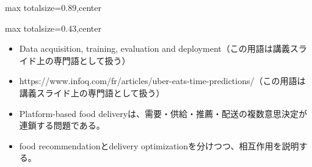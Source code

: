 \begin{minipage}[t]{0.58\textwidth}
\begin{adjustbox}{max totalsize={\textwidth}{0.89\textheight},center}
\begin{minipage}{\textwidth}
\end{minipage}
\end{adjustbox}
\end{minipage}


\clearpage
{}
\begin{minipage}[t]{0.405\textwidth}
\begin{adjustbox}{max totalsize={\textwidth}{0.43\textheight},center}
\begin{minipage}{\textwidth}\scriptsize
{}\begin{itemize}
\item Data acquisition, training, evaluation and deployment（この用語は講義スライド上の専門語として扱う）
\item https://www.infoq.com/fr/articles/uber-eats-time-predictions/（この用語は講義スライド上の専門語として扱う）
\end{itemize}\begin{itemize}
\item Platform-based food deliveryは、需要・供給・推薦・配送の複数意思決定が連鎖する問題である。
\item food recommendationとdelivery optimizationを分けつつ、相互作用を説明する。
\end{itemize}
\end{minipage}
\end{adjustbox}
\end{minipage}\hfill
